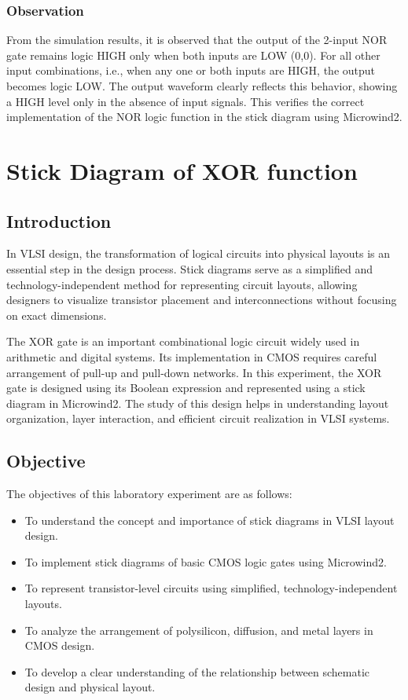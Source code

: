 \documentclass[12pt,a4paper]{report}
\begin{document}
\subsection*{Observation}
From the simulation results, it is observed that the output of the 2-input NOR gate remains logic HIGH only when both inputs are LOW (0,0). For all other input combinations, i.e., when any one or both inputs are HIGH, the output becomes logic LOW. The output waveform clearly reflects this behavior, showing a HIGH level only in the absence of input signals. This verifies the correct implementation of the NOR logic function in the stick diagram using Microwind2.






\chapter{Stick Diagram of XOR function}

\section*{Introduction}
In VLSI design, the transformation of logical circuits into physical layouts is an essential step in the design process. Stick diagrams serve as a simplified and technology-independent method for representing circuit layouts, allowing designers to visualize transistor placement and interconnections without focusing on exact dimensions.

The XOR gate is an important combinational logic circuit widely used in arithmetic and digital systems. Its implementation in CMOS requires careful arrangement of pull-up and pull-down networks. In this experiment, the XOR gate is designed using its Boolean expression and represented using a stick diagram in Microwind2. The study of this design helps in understanding layout organization, layer interaction, and efficient circuit realization in VLSI systems.



\section*{Objective}
The objectives of this laboratory experiment are as follows:
\begin{itemize}
    \item To understand the concept and importance of stick diagrams in VLSI layout design.
    \item To implement stick diagrams of basic CMOS logic gates using Microwind2.
    \item To represent transistor-level circuits using simplified, technology-independent layouts.
    \item To analyze the arrangement of polysilicon, diffusion, and metal layers in CMOS design.
    \item To develop a clear understanding of the relationship between schematic design and physical layout.
\end{itemize}
\end{document}
